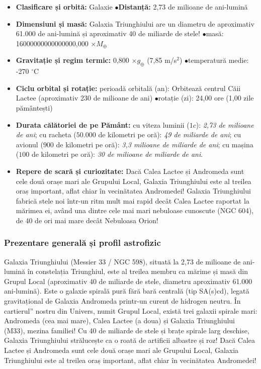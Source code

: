 \begin{tcolorbox}[orbitardata, title={\textbf{Repere esențiale: Galaxia Triunghiului (M33)}}]
\small
\begin{itemize}[leftmargin=1.4em, itemsep=2pt, topsep=2pt]
  \item \textbf{Clasificare și orbită:} Galaxie \quad$\bullet$\quad \textbf{Distanță:} 2,73 de milioane de ani-lumină
  \item \textbf{Dimensiuni și masă:} Galaxia Triunghiului are un diametru de aproximativ 61.000 de ani-lumină și aproximativ 40 de miliarde de stele! \quad$\bullet$\quad masă: 16000000000000000,000 $\times M_\oplus$
  \item \textbf{Gravitație și regim termic:} 0,800 $\times g_\oplus$ (7,85 m/s$^2$) \quad$\bullet$\quad temperatură medie: -270 $^\circ$C
  \item \textbf{Ciclu orbital și rotație:} perioadă orbitală (an): Orbitează centrul Căii Lactee (aproximativ 230 de milioane de ani) \quad$\bullet$\quad rotație (zi): 24,00 ore (1,00 zile pământești)
  \item \textbf{Durata călătoriei de pe Pământ:} cu viteza luminii ($1c$): \emph{2,73 de milioane de ani}; cu racheta ($50.000$ de kilometri pe oră): \emph{49 de miliarde de ani}; cu avionul ($900$ de kilometri pe oră): \emph{3,3 milioane de miliarde de ani}; cu mașina ($100$ de kilometri pe oră): \emph{30 de milioane de miliarde de ani}.
  \item \textbf{Repere de scară și curiozitate:} Dacă Calea Lactee și Andromeda sunt cele două orașe mari ale Grupului Local, Galaxia Triunghiului este al treilea oraș important, aflat chiar în vecinătatea Andromedei! Galaxia Triunghiului fabrică stele noi într-un ritm mult mai rapid decât Calea Lactee raportat la mărimea ei, având una dintre cele mai mari nebuloase cunoscute (NGC 604), de 40 de ori mai mare decât Nebuloasa Orion!
\end{itemize}
\end{tcolorbox}

\subsubsection*{Prezentare generală și profil astrofizic}
Galaxia Triunghiului (Messier 33 / NGC 598), situată la 2,73 de milioane de ani-lumină în constelația Triunghiul, este al treilea membru ca mărime și masă din Grupul Local (aproximativ 40 de miliarde de stele, diametru aproximativ 61.000 ani-lumină). Este o galaxie spirală pură fără bară centrală (tip SA(s)cd), legată gravitațional de Galaxia Andromeda printr-un curent de hidrogen neutru. În \quotedblbase{}cartierul\textquotedblright{} nostru din Univers, numit Grupul Local, există trei galaxii spirale mari: Andromeda (cea mai mare), Calea Lactee (a doua) și Galaxia Triunghiului (M33), mezina familiei! Cu 40 de miliarde de stele și brațe spirale larg deschise, Galaxia Triunghiului strălucește ca o roată de artificii albastre și roz! Dacă Calea Lactee și Andromeda sunt cele două orașe mari ale Grupului Local, Galaxia Triunghiului este al treilea oraș important, aflat chiar în vecinătatea Andromedei!

